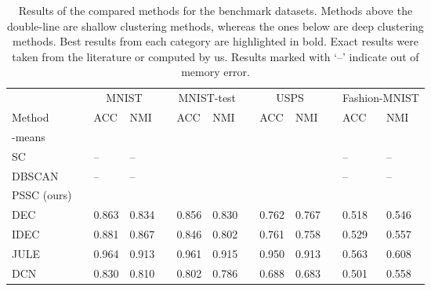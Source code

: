 \documentclass[11pt]{article}
\theoremstyle{definition}
\begin{document}
\begin{table*}[t]
	\centering
	\caption{Results of the compared methods for the benchmark datasets. Methods above the double-line are shallow clustering methods, whereas the ones below are deep clustering methods. Best results from each category are highlighted in bold. Exact results were taken from the literature or computed by us. Results marked with `--' indicate out of memory error.}
	\label{table:clustering evaluation}
	\scriptsize
	\begin{adjustbox}{width=0.99\textwidth}
		\begin{tabular}{lr|llrllrllrll}
			\hline
			&&  \multicolumn{2}{c}{MNIST} && \multicolumn{2}{c}{MNIST-test} && \multicolumn{2}{c}{USPS} && \multicolumn{2}{c}{Fashion-MNIST} \\
			
			Method && ACC & NMI && ACC & NMI  && ACC & NMI  && ACC & NMI \\
			
			\hline
			
			-means~\cite{Macqueen_KMeansClustering_1967}
			&&   &  &&  &  
			&&  &   &&  &   \\
			
			SC~\cite{Ng_SpectralClustering_2002}
			&& -- & -- &&  &  
			&&  &  && -- & -- \\
			
			DBSCAN~\cite{Ester_DBSCANDensityBasedClustering_1996}
			&& -- & -- &&  &  
			&&  &  && -- & -- \\
			
			PSSC (ours) &&  &  &&  & 
			&&  &  &&  &  \\
			
			\hline
			\hline
			
			DEC~\cite{Xie_UnsupervisedDeepEmbeddingClustering_2016}
			&& 0.863 & 0.834 && 0.856 & 0.830 
			&& 0.762 & 0.767 && 0.518 & 0.546 \\
			
			IDEC~\cite{Guo_ImprovedDeepEmbeddedClustering_2017}
			&& 0.881& 0.867&& 0.846& 0.802
			&& 0.761& 0.758&& 0.529& 0.557\\
			
			JULE~\cite{Yang_JointUnsupervisedLearningImageClusters_2016joint}
			&& 0.964& 0.913&& 0.961& 0.915
			&& 0.950& 0.913&& 0.563& 0.608\\
			
			DCN~\cite{Yang_TowrdsKMeansFriendlySpacesDeepClustering_2017}
			&& 0.830 & 0.810 && 0.802 & 0.786 
			&& 0.688 & 0.683 && 0.501 & 0.558 \\
			

\end{tabular}
\end{adjustbox}
\end{table*}
\end{document}
